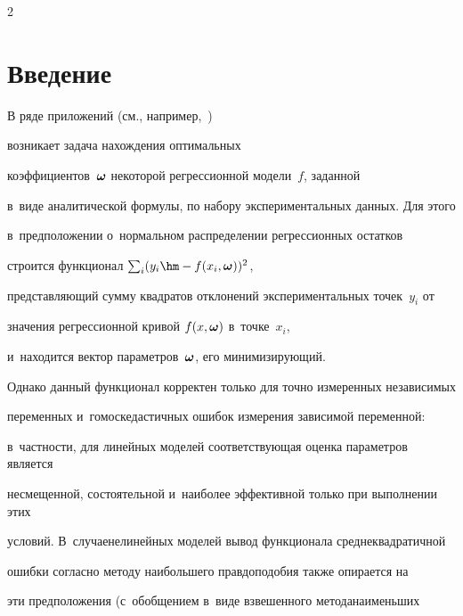 \begin{multicols}{2}



\label{st\stat}





\section{Введение}



\vspace*{-2pt}



В ряде приложений (см., например,~\cite{Gladun2004Labs,Rudoy15MonteCarlo})

возникает задача нахождения оптимальных

коэффициентов~$\boldsymbol{\omega}$ некоторой регрессионной модели~$f$, заданной

в~виде аналитической формулы, по набору экспериментальных данных. Для этого

в~предположении о~нормальном распределении регрессионных остатков

строится функционал $\sum\nolimits_i (y_i \hm- f(x_i, \bomega))^2$,

представляющий сумму квад\-ра\-тов отклонений экспериментальных точек~$y_i$ от

значения регрессионной кривой $f(x, \boldsymbol{\omega})$ в~точке~$x_i$,

и~находится вектор параметров~$\boldsymbol{\omega}$, его минимизирующий.



Однако данный функционал корректен только для точно измеренных независимых

переменных и~гомоскедастичных ошибок измерения зависимой переменной:

в~част\-ности, для линейных моделей соответствующая оценка параметров является

несмещенной, со\-сто\-ятель\-ной и~наиболее эффективной только при выполнении этих

условий. В~случае\linebreak нелинейных моделей вывод функционала среднеквадратичной

ошибки согласно методу наибольшего прав\-до\-по\-до\-бия также опирается на

эти предположения (с~обобщением в~виде взвешенного метода\linebreak наименьших


\end{multicols}
